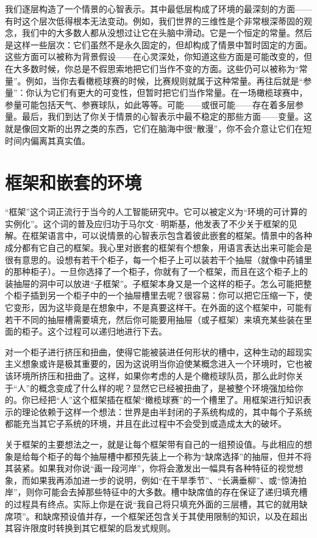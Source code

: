 我们逐层构造了一个情景的心智表示。其中最低层构成了环境的最深刻的方面——有时这个层次低得根本无法变动。例如，我们世界的三维性是个非常根深蒂固的观念，我们中的大多数人都从没想过让它在头脑中滑动。它是一个恒定的常量。然后是这样一些层次：它们虽然不是永久固定的，但却构成了情景中暂时固定的方面。这些方面可以被称为背景假设——在心灵深处，你知道这些方面是可能改变的，但在大多数时候，你总是不假思索地把它们当作不变的方面。这些仍可以被称为“常量”。例如，当你去看橄榄球赛的时候，比赛规则就属于这种常量。再往后就是“参量”：你认为它们有更大的可变性，但暂时把它们当作常量。在一场橄榄球赛中，参量可能包括天气、参赛球队，如此等等。可能——或很可能——存在着多层参量。最后，我们到达了你关于情景的心智表示中最不稳定的那些方面——变量。这就是像回文斯的出界之类的东西，它们在脑海中很“散漫”，你不会介意让它们在短时间内偏离其真实值。

\section{框架和嵌套的环境}

“框架”这个词正流行于当今的人工智能研究中。它可以被定义为“环境的可计算的实例化”。这个词的普及应归功于马尔文·明斯基，他发表了不少关于框架的见解。在框架语言中，可以说情景的心智表示包含着彼此嵌套的框架。情景中的各种成分都有它自己的框架。我心里对嵌套的框架有个想象，用语言表达出来可能会是很有意思的。设想有若干个柜子，每一个柜子上可以装若干个抽屉（就像中药铺里的那种柜子）。一旦你选择了一个柜子，你就有了一个框架，而且在这个柜子上的装抽屉的洞中可以放进“子框架”。子框架本身又是一个这样的柜子。怎么可能把整个柜子插到另一个柜子中的一个抽屉槽里去呢？很容易：你可以把它压缩一下，使它变形，因为这毕竟是在想象中，不是真要这样干。在外面的这个框架中，可能有若干不同的抽屉槽需要填充，然后你可能要用抽屉（或子框架）来填充某些装在里面的柜子。这个过程可以递归地进行下去。

对一个柜子进行挤压和扭曲，使得它能被装进任何形状的槽中，这种生动的超现实主义想象或许是极其重要的，因为这说明当你迫使某概念进入一个环境时，它也被该环境所挤压和扭曲了。这样，如果你考虑的人是个橄榄球队员，那么此时你关于“人”的概念变成了什么样的呢？显然它已经被扭曲了，是被整个环境强加给你的。你已经把“人”这个框架插在框架“橄榄球赛”的一个槽里了。用框架进行知识表示的理论依赖于这样一个想法：世界是由半封闭的子系统构成的，其中每个子系统都能充当其它子系统的环境，并且在此过程中不会受到或造成太大的破坏。

关于框架的主要想法之一，就是让每个框架带有自己的一组预设值。与此相应的想象是给每个柜子的每个抽屉槽中都预先装上一个称为“缺席选择”的抽屉，但并不将其装紧。如果我对你说“画一段河岸”，你将会激发出一幅具有各种特征的视觉想象，而如果我再添加进一步的说明，例如“在干旱季节”、“长满垂柳”、或“惊涛拍岸”，则你可能会去掉那些特征中的大多数。槽中缺席值的存在保证了递归填充槽的过程具有终点。实际上你是在说“我自己将只填充外面的三层槽，其它的就用缺席项”。和缺席预设值并存，一个框架还包含关于其使用限制的知识，以及在超出其容许限度时转换到其它框架的启发式规则。

